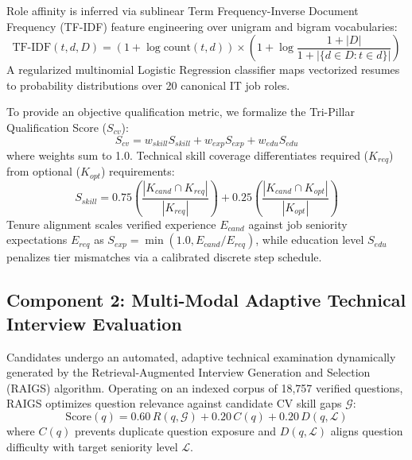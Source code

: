 \documentclass[conference]{IEEEtran}
\begin{document}
Role affinity is inferred via sublinear Term Frequency-Inverse Document Frequency (TF-IDF) feature engineering over unigram and bigram vocabularies:
\begin{equation}
\text{TF-IDF}(t, d, D) = (1 + \log \text{count}(t, d)) \times \left(1 + \log \frac{1 + |D|}{1 + |\{d \in D : t \in d\}|}\right)
\end{equation}
A regularized multinomial Logistic Regression classifier maps vectorized resumes to probability distributions over 20 canonical IT job roles. 

To provide an objective qualification metric, we formalize the Tri-Pillar Qualification Score ($S_{cv}$):
\begin{equation}
S_{cv} = w_{skill} S_{skill} + w_{exp} S_{exp} + w_{edu} S_{edu}
\end{equation}
where weights sum to 1.0. Technical skill coverage differentiates required ($K_{req}$) from optional ($K_{opt}$) requirements:
\begin{equation}
S_{skill} = 0.75 \left(\frac{|K_{cand} \cap K_{req}|}{|K_{req}|}\right) + 0.25 \left(\frac{|K_{cand} \cap K_{opt}|}{|K_{opt}|}\right)
\end{equation}
Tenure alignment scales verified experience $E_{cand}$ against job seniority expectations $E_{req}$ as $S_{exp} = \min(1.0, E_{cand}/E_{req})$, while education level $S_{edu}$ penalizes tier mismatches via a calibrated discrete step schedule.

\subsection{Component 2: Multi-Modal Adaptive Technical Interview Evaluation}
Candidates undergo an automated, adaptive technical examination dynamically generated by the Retrieval-Augmented Interview Generation and Selection (RAIGS) algorithm. Operating on an indexed corpus of 18,757 verified questions, RAIGS optimizes question relevance against candidate CV skill gaps $\mathcal{G}$:
\begin{equation}
\text{Score}(q) = 0.60\,R(q, \mathcal{G}) + 0.20\,C(q) + 0.20\,D(q, \mathcal{L})
\end{equation}
where $C(q)$ prevents duplicate question exposure and $D(q, \mathcal{L})$ aligns question difficulty with target seniority level $\mathcal{L}$.
\end{document}
